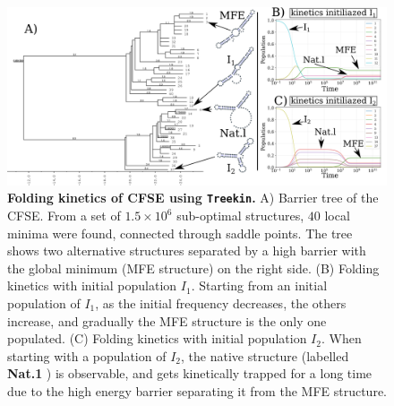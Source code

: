 \begin{figure}[t!]
	\centering
	\includegraphics[width=0.9\linewidth]{../res/images/rafft/kinetic_treekin.png}
	\caption{\label{treekin}\textbf{Folding kinetics of CFSE using \texttt{Treekin}. }A) Barrier tree of the CFSE. From a set of $1.5\times10^6$ sub-optimal structures, $40$ local minima were found,  connected through saddle points. The tree shows two alternative structures separated by a high barrier with the global minimum (MFE structure) on the right side. (B) Folding kinetics with initial population $I_1$. Starting from an initial population of $I_1$, as the initial frequency  decreases, the others increase, and gradually the MFE structure is the only one populated.  (C) Folding kinetics with initial population $I_2$. When starting with a population of $I_2$, the native structure (labelled \textbf{Nat.1} ) is observable, and gets kinetically trapped for a long time due to the high energy barrier separating it from the MFE structure.}
\end{figure}

